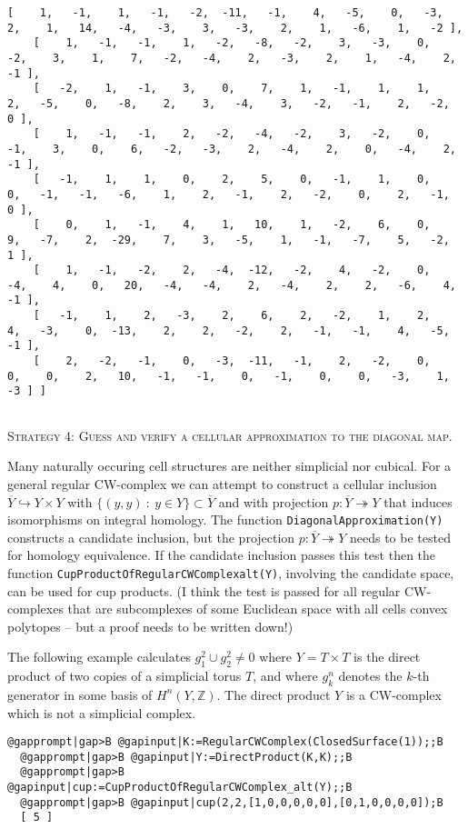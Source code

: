 \documentclass[a4paper,11pt]{report}
\begin{document}
{{\begin{Verbatim}[commandchars=!@|,fontsize=\small,frame=single,label=Example]
    [    1,   -1,    1,   -1,   -2,  -11,   -1,    4,   -5,    0,   -3,    2,    1,   14,   -4,   -3,    3,   -3,    2,    1,   -6,    1,   -2 ],
    [    1,   -1,   -1,    1,   -2,   -8,   -2,    3,   -3,    0,   -2,    3,    1,    7,   -2,   -4,    2,   -3,    2,    1,   -4,    2,   -1 ],
    [   -2,    1,   -1,    3,    0,    7,    1,   -1,    1,    1,    2,   -5,    0,   -8,    2,    3,   -4,    3,   -2,   -1,    2,   -2,    0 ],
    [    1,   -1,   -1,    2,   -2,   -4,   -2,    3,   -2,    0,   -1,    3,    0,    6,   -2,   -3,    2,   -4,    2,    0,   -4,    2,   -1 ],
    [   -1,    1,    1,    0,    2,    5,    0,   -1,    1,    0,    0,   -1,   -1,   -6,    1,    2,   -1,    2,   -2,    0,    2,   -1,    0 ],
    [    0,    1,   -1,    4,    1,   10,    1,   -2,    6,    0,    9,   -7,    2,  -29,    7,    3,   -5,    1,   -1,   -7,    5,   -2,    1 ],
    [    1,   -1,   -2,    2,   -4,  -12,   -2,    4,   -2,    0,   -4,    4,    0,   20,   -4,   -4,    2,   -4,    2,    2,   -6,    4,   -1 ],
    [   -1,    1,    2,   -3,    2,    6,    2,   -2,    1,    2,    4,   -3,    0,  -13,    2,    2,   -2,    2,   -1,   -1,    4,   -5,   -1 ],
    [    2,   -2,   -1,    0,   -3,  -11,   -1,    2,   -2,    0,    0,    0,    2,   10,   -1,   -1,    0,   -1,    0,    0,   -3,    1,   -3 ] ]
  
\end{Verbatim}
 

\textsc{Strategy 4: Guess and verify a cellular approximation to the diagonal map.} 

Many naturally occuring cell structures are neither simplicial nor cubical.
For a general regular CW-complex we can attempt to construct a cellular
inclusion $\overline Y \hookrightarrow Y\times Y$ with $\{(y,y)\ :\ y\in Y\}\subset \overline Y$ and with projection $p\colon \overline Y \twoheadrightarrow Y$ that induces isomorphisms on integral homology. The function \texttt{DiagonalApproximation(Y)} constructs a candidate inclusion, but the projection $p\colon \overline Y \twoheadrightarrow Y$ needs to be tested for homology equivalence. If the candidate inclusion passes
this test then the function \texttt{CupProductOfRegularCWComplex{\textunderscore}alt(Y)}, involving the candidate space, can be used for cup products. (I think the
test is passed for all regular CW-complexes that are subcomplexes of some
Euclidean space with all cells convex polytopes -- but a proof needs to be
written down!) 

The following example calculates $g_1^2 \cup g_2^2 \ne 0$ where $Y=T\times T$ is the direct product of two copies of a simplicial torus $T$, and where $g_k^n$ denotes the $k$-th generator in some basis of $H^n(Y,\mathbb Z)$. The direct product $Y$ is a CW-complex which is not a simplicial complex. 
\begin{Verbatim}[commandchars=@|B,fontsize=\small,frame=single,label=Example]
  @gapprompt|gap>B @gapinput|K:=RegularCWComplex(ClosedSurface(1));;B
  @gapprompt|gap>B @gapinput|Y:=DirectProduct(K,K);;B
  @gapprompt|gap>B @gapinput|cup:=CupProductOfRegularCWComplex_alt(Y);;B
  @gapprompt|gap>B @gapinput|cup(2,2,[1,0,0,0,0,0],[0,1,0,0,0,0]);B
  [ 5 ]
  

\end{Verbatim}}}
\end{document}
